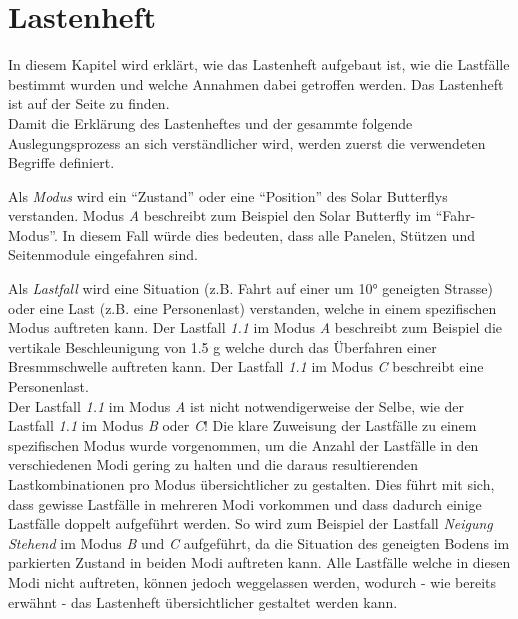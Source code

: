 \section{Lastenheft}
\label{Lastenheft}
In diesem Kapitel wird erklärt, wie das Lastenheft aufgebaut ist, wie die Lastfälle bestimmt wurden und welche Annahmen dabei getroffen werden. Das Lastenheft ist auf der Seite \pageref{Lastenheft A} zu finden.\\

Damit die Erklärung des Lastenheftes und der gesammte folgende Auslegungsprozess an sich verständlicher wird, werden zuerst die verwendeten Begriffe definiert.

Als \emph{Modus} wird ein ``Zustand'' oder eine ``Position'' des Solar Butterflys verstanden. Modus \emph{A} beschreibt zum Beispiel den Solar Butterfly im ``Fahr-Modus''. In diesem Fall würde dies bedeuten, dass alle Panelen, Stützen und Seitenmodule eingefahren sind.

Als \emph{Lastfall} wird eine Situation (z.B. Fahrt auf einer um 10° geneigten Strasse) oder eine Last (z.B. eine Personenlast) verstanden, welche in einem spezifischen Modus auftreten kann. Der Lastfall \emph{1.1} im Modus \emph{A} beschreibt zum Beispiel die vertikale Beschleunigung von 1.5 g welche durch das Überfahren einer Bresmmschwelle auftreten kann. Der Lastfall \emph{1.1} im Modus \emph{C} beschreibt eine Personenlast.\\
Der Lastfall \emph{1.1} im Modus \emph{A} ist nicht notwendigerweise der Selbe, wie der Lastfall \emph{1.1} im Modus \emph{B} oder \emph{C}! Die klare Zuweisung der Lastfälle zu einem spezifischen Modus wurde vorgenommen, um die Anzahl der Lastfälle in den verschiedenen Modi gering zu halten und die daraus resultierenden Lastkombinationen pro Modus übersichtlicher zu gestalten. Dies führt mit sich, dass gewisse Lastfälle in mehreren Modi vorkommen und dass dadurch einige Lastfälle doppelt aufgeführt werden. So wird zum Beispiel der Lastfall \emph{Neigung Stehend} im Modus \emph{B} und \emph{C} aufgeführt, da die Situation des geneigten Bodens im parkierten Zustand in beiden Modi auftreten kann. Alle Lastfälle welche in diesen Modi nicht auftreten, können jedoch weggelassen werden, wodurch - wie bereits erwähnt - das Lastenheft übersichtlicher gestaltet werden kann.

